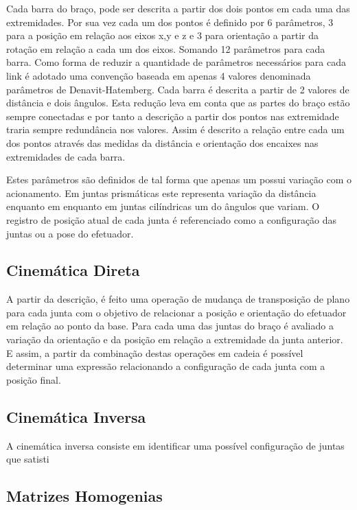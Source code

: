 Cada barra do braço, pode ser descrita a partir dos dois pontos em cada uma das extremidades. Por sua vez cada um dos pontos é definido por 6 parâmetros, 3 para a posição em relação aos eixos x,y e z e 3 para orientação a partir da rotação em relação a cada um dos eixos. Somando 12 parâmetros para cada barra. Como forma de reduzir a quantidade de parâmetros necessários para cada link é adotado uma convenção baseada em apenas 4 valores denominada parâmetros de Denavit-Hatemberg. Cada barra é descrita a partir de 2 valores de distância e dois ângulos. Esta redução leva em conta que as partes do braço estão sempre conectadas e por tanto a descrição a partir dos pontos nas extremidade traria sempre redundância nos valores. Assim é descrito a relação entre cada um dos pontos através das medidas da distância e orientação dos encaixes nas extremidades de cada barra.


Estes parâmetros são definidos de tal forma que apenas um possui variação com o acionamento. Em juntas prismáticas este representa variação da distância enquanto em enquanto em juntas cilíndricas um do ângulos que variam. O registro de posição atual de cada junta é referenciado como a configuração das juntas ou a pose do efetuador.

\subsection{Cinemática Direta}

A partir da descrição, é feito uma operação de mudança de transposição de plano para cada junta com o objetivo de relacionar a posição e orientação do efetuador em relação ao ponto da base. Para cada uma das juntas do braço é avaliado a variação da orientação e da posição em relação a extremidade da junta anterior. E assim, a partir da combinação destas operações em cadeia é possível determinar uma expressão relacionando a configuração de cada junta com a posição final.

\subsection{Cinemática Inversa}

A cinemática inversa consiste em identificar uma possível configuração de juntas que satisti

\subsection{Matrizes Homogenias}

